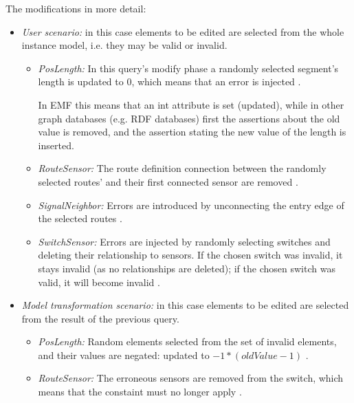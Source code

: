 The modifications in more detail:
\begin{itemize}
  \item \emph{User scenario:} in this case elements to be edited are selected from the whole instance model, i.e. they may be valid or invalid. 
  \begin{itemize}
    
    \item \emph{PosLength:} In this query's modify phase a randomly selected segment's length is updated to 0, which means that an error is injected .
    
    In EMF this means that an int attribute is set (updated), while in other graph databases (e.g. RDF databases) first the assertions about the old value is removed, and the assertion stating the new value of the length is inserted.
    
    \item \emph{RouteSensor:} The route definition connection between the randomly selected routes' and their first connected sensor are removed .
    
    \item \emph{SignalNeighbor:} Errors are introduced by unconnecting the entry edge of the selected routes .

    \item \emph{SwitchSensor:} Errors are injected by randomly selecting switches and deleting their relationship to sensors. If the chosen switch was invalid, it stays invalid (as no relationships are deleted); if the chosen switch was valid, it will become invalid .
        
  \end{itemize}
  \item \emph{Model transformation scenario:} in this case elements to be edited are selected from the result of the previous query.
  \begin{itemize}
    
    \item \emph{PosLength:} Random elements selected from the set of invalid elements, and their values are negated: updated to $-1*(\mathit{oldValue}-1)$ .
    
    \item \emph{RouteSensor:} The erroneous sensors are removed from the switch, which means that the constaint must no longer apply .
    

\end{itemize}
\end{itemize}
